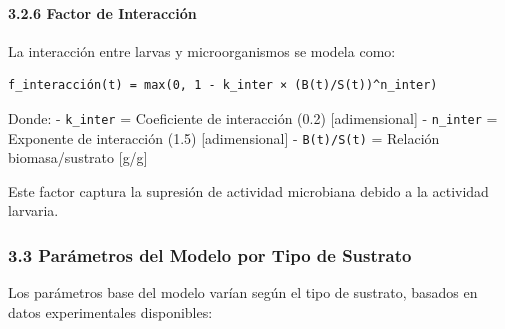 \documentclass[
]{article}
\begin{document}
\paragraph{3.2.6 Factor de Interacción}\label{factor-de-interacciuxf3n}

La interacción entre larvas y microorganismos se modela como:

\begin{verbatim}
f_interacción(t) = max(0, 1 - k_inter × (B(t)/S(t))^n_inter)
\end{verbatim}

Donde: - \texttt{k\_inter} = Coeficiente de interacción (0.2)
{[}adimensional{]} - \texttt{n\_inter} = Exponente de interacción (1.5)
{[}adimensional{]} - \texttt{B(t)/S(t)} = Relación biomasa/sustrato
{[}g/g{]}

Este factor captura la supresión de actividad microbiana debido a la
actividad larvaria.

\subsubsection{3.3 Parámetros del Modelo por Tipo de
Sustrato}\label{paruxe1metros-del-modelo-por-tipo-de-sustrato}

Los parámetros base del modelo varían según el tipo de sustrato, basados
en datos experimentales disponibles:
\end{document}
